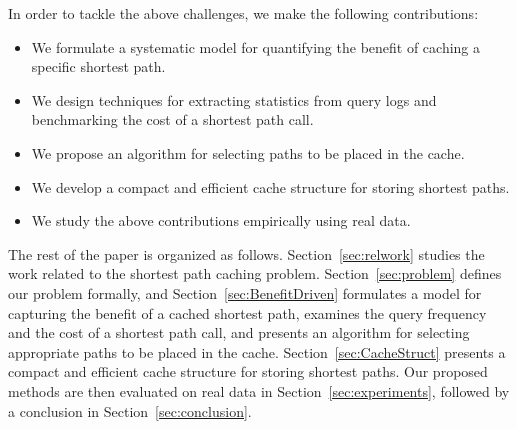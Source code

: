 \documentclass{sig-alternate}
\newcommand{\spath}{SP\xspace}
\begin{document}









In order to tackle the above challenges, we make the following contributions:
\begin{itemize}
    \itemsep -2pt
    \item We formulate a systematic model for quantifying the benefit of caching a specific shortest path.
    \item We design techniques for extracting statistics from query logs
          and benchmarking the cost of a shortest path call.
    \item We propose an algorithm for selecting paths to be placed in the cache.
    \item We develop a compact and efficient cache structure for storing shortest paths.
    \item We study the above contributions empirically using real data.
\end{itemize}


The rest of the paper is organized as follows.
Section~\ref{sec:relwork} studies the work related to the shortest path caching problem.
Section~\ref{sec:problem} defines our problem formally, and
Section~\ref{sec:BenefitDriven} formulates a model for capturing the benefit of a cached shortest path,
examines the query frequency and the cost of a shortest path call, and presents an algorithm for selecting
appropriate paths to be placed in the cache.
Section~\ref{sec:CacheStruct} presents a compact and efficient cache structure for storing shortest paths.
Our proposed methods are then evaluated on real data in Section~\ref{sec:experiments},
followed by a conclusion in Section~\ref{sec:conclusion}.
\end{document}
